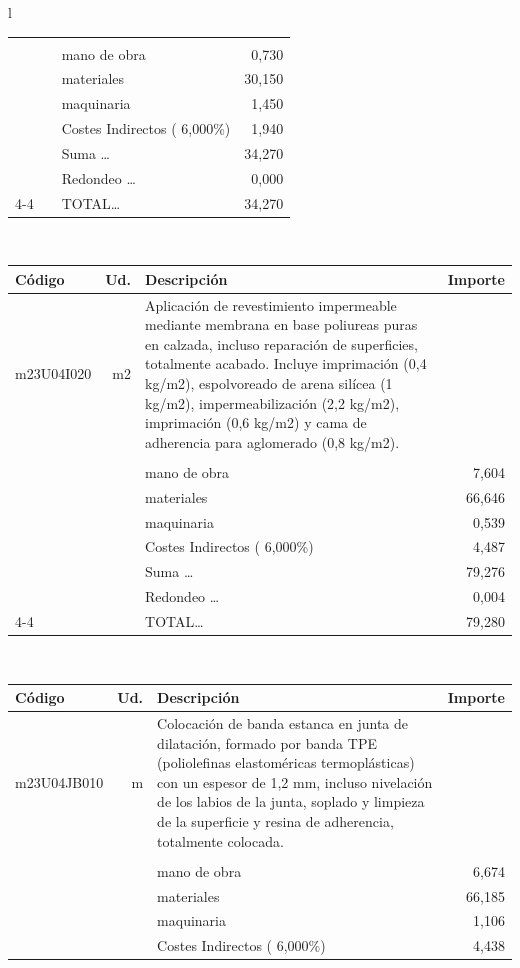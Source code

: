 \documentclass{book}%
\begin{document}
\begin{longtable}{l}
\begin{tabular}{l r p{60mm} r}
&&&\\%
&&mano de obra&     0,730\\%
&&materiales&    30,150\\%
&&maquinaria&     1,450\\%
&&Costes Indirectos (     6,000\%)&     1,940\\%
&&Suma \ldots&    34,270\\%
&&Redondeo \ldots&     0,000\\%
\cline{4-4}%
&&TOTAL\ldots&    34,270\\%
\end{tabular}\\%
\begin{tabular}{l r p{60mm} r}%
Código&Ud.&Descripción&Importe\\%
\hline%
m23U04I020&m2&Aplicación de revestimiento impermeable mediante membrana en base poliureas puras en calzada, incluso reparación de superficies, totalmente acabado. Incluye imprimación (0,4 kg/m2), espolvoreado de arena silícea (1 kg/m2), impermeabilización (2,2 kg/m2), imprimación (0,6 kg/m2) y cama de adherencia para aglomerado (0,8 kg/m2).&\\%
&&&\\%
&&mano de obra&     7,604\\%
&&materiales&    66,646\\%
&&maquinaria&     0,539\\%
&&Costes Indirectos (     6,000\%)&     4,487\\%
&&Suma \ldots&    79,276\\%
&&Redondeo \ldots&     0,004\\%
\cline{4-4}%
&&TOTAL\ldots&    79,280\\%
\end{tabular}\\%
\begin{tabular}{l r p{60mm} r}%
Código&Ud.&Descripción&Importe\\%
\hline%
m23U04JB010&m&Colocación de banda estanca en junta de dilatación, formado por banda TPE (poliolefinas elastoméricas termoplásticas) con un espesor de 1,2 mm, incluso nivelación de los labios de la junta, soplado y limpieza de la superficie y resina de adherencia, totalmente colocada.&\\%
&&&\\%
&&mano de obra&     6,674\\%
&&materiales&    66,185\\%
&&maquinaria&     1,106\\%
&&Costes Indirectos (     6,000\%)&     4,438\\%

\end{tabular}
\end{longtable}
\end{document}
